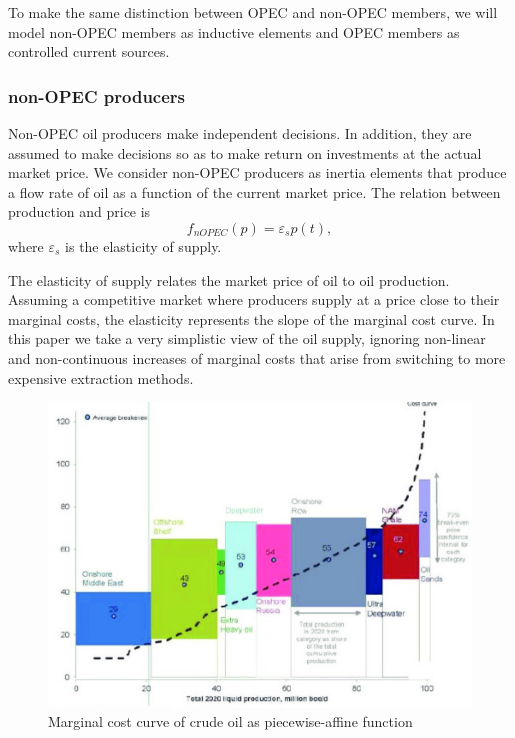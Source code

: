 To make the same distinction between OPEC and non-OPEC members, we will model non-OPEC members as inductive elements and OPEC members as controlled current sources.

\subsubsection{non-OPEC producers}
Non-OPEC oil producers make independent decisions.
In addition, they are assumed to make decisions so as to make return on investments at the actual market price.
We consider non-OPEC producers as inertia elements that produce a flow rate of oil as a function of the current market price.
The relation between production and price is
\begin{equation}
    f_{nOPEC}(p) = \varepsilon_{s} p(t),
\end{equation}
where $\varepsilon_s$ is the elasticity of supply.

The elasticity of supply relates the market price of oil to oil production.
Assuming a competitive market where producers supply at a price close to their marginal costs, the elasticity represents the slope of the marginal cost curve.
In this paper we take a very simplistic view of the oil supply, ignoring non-linear and non-continuous increases of marginal costs that arise from switching to more expensive extraction methods.

\begin{figure}
    \centering
    \includegraphics[width=.4\textwidth]{Figures/cost curve.PNG}
    \caption{Marginal cost curve of crude oil as piecewise-affine function}
    \label{fig:marginalcost}
\end{figure}


